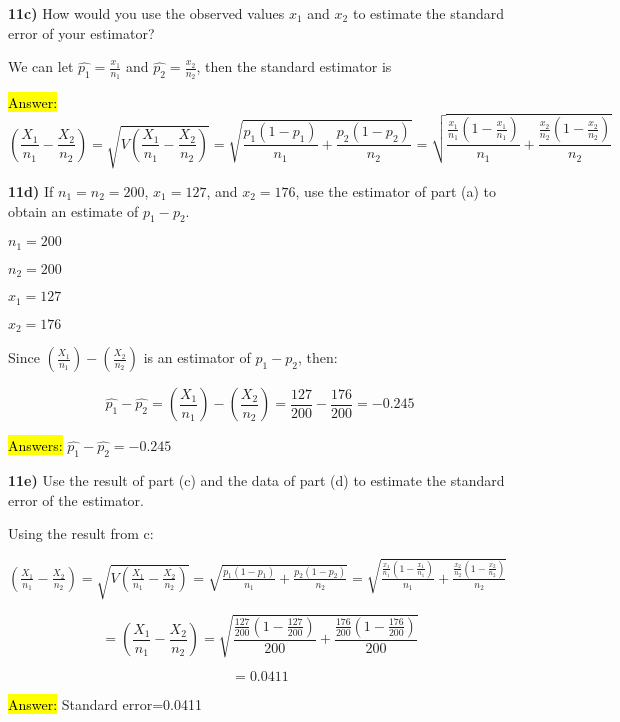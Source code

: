 \documentclass{article}
\begin{document}
\vspace{3mm}
\textbf{11c)} How would you use the observed values $x_1$ and $x_2$ to estimate the standard error of your estimator?

We can let $\hat{p_{1}}=\frac{x_{1}}{n_{1}}$ and $\hat{p_{2}}=\frac{x_{2}}{n_{2}}$, then the standard estimator is
\vspace{2mm}

\hl{Answer:} $$(\frac{X_{1}}{n_{1}}-\frac{X_{2}}{n_{2}})=\sqrt{V(\frac{X_{1}}{n_{1}}-\frac{X_{2}}{n_{2}})}=\sqrt{\frac{p_{1}(1-p_{1})}{n_{1}}+\frac{p_{2}(1-p_{2})}{n_{2}}}=\sqrt{\frac{\frac{x_{1}}{n_{1}}(1-\frac{x_{1}}{n_{1}})}{n_{1}}+{\frac{\frac{x_{2}}{n_{2}}(1-\frac{x_{2}}{n_{2}})}{n_{2}}}}$$
\newpage

\textbf{11d)} If $n_1=n_2=200$, $x_{1}=127$, and $x_{2}=176$, use the estimator of part (a) to obtain an estimate of 
$p_{1}-p_{2}$. 

$n_1=200$

$n_2=200$

$x_{1}=127$

$x_{2}=176$
\vspace{3mm}

Since $(\frac{X_{1}}{n_{1}})-(\frac{X_{2}}{n_{2}} )$ is an estimator of $p_{1} - p_{2}$, then:

$$\hat{p_{1}}-\hat{p_{2}}=(\frac{X_{1}}{n_{1}})-(\frac{X_{2}}{n_{2}} )=\frac{127}{200}-\frac{176}{200}=-0.245$$

\hl{Answers:} $\hat{p_{1}}-\hat{p_{2}}=-0.245$

\vspace{3mm}
\textbf{11e)} Use the result of part (c) and the data of part (d) to estimate the standard error of the estimator.
\vspace{3mm}

Using the result from c:

$(\frac{X_{1}}{n_{1}}-\frac{X_{2}}{n_{2}})=\sqrt{V(\frac{X_{1}}{n_{1}}-\frac{X_{2}}{n_{2}})}=\sqrt{\frac{p_{1}(1-p_{1})}{n_{1}}+\frac{p_{2}(1-p_{2})}{n_{2}}}=\sqrt{\frac{\frac{x_{1}}{n_{1}}(1-\frac{x_{1}}{n_{1}})}{n_{1}}+{\frac{\frac{x_{2}}{n_{2}}(1-\frac{x_{2}}{n_{2}})}{n_{2}}}}$

$$=(\frac{X_{1}}{n_{1}}-\frac{X_{2}}{n_{2}})=\sqrt{\frac{\frac{127}{200}(1-\frac{127}{200})}{200}+{\frac{\frac{176}{200}(1-\frac{176}{200})}{200}}}$$

$$=0.0411$$


\hl{Answer:} Standard error=0.0411
\end{document}
